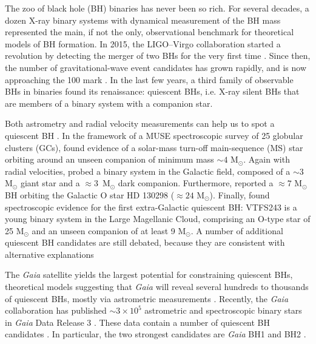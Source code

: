 \documentclass[fleqn,usenatbib]{mnras}
\newcommand{\Ms}{M$_\odot$}
\newcommand{\bh}{\textit{Gaia} BH1}
\begin{document}
The zoo of black hole (BH) binaries has never been so rich. For several decades, a dozen X-ray binary systems with dynamical  measurement of the BH mass \citep{oezel2010,farr2011,miller2015} represented the main, if not the only, observational benchmark for theoretical models of BH formation.  
In 2015, the LIGO--Virgo collaboration started a revolution by detecting the merger of two BHs for the very first time \citep{abbottGW150914}. Since then, the number of gravitational-wave event candidates 
has grown rapidly, and is now approaching the 100 mark \citep{abbottGWTC2.1,abbottGWTC3}. In the last few years, a third family of observable BHs in binaries found its renaissance: quiescent BHs, i.e. X-ray silent BHs that are members of a binary system with a companion star.


Both astrometry and radial velocity measurements can help us to spot a quiescent BH \citep{trimble1969}. In the framework of a MUSE spectroscopic survey of 25 globular clusters (GCs), \cite{giesers2018} found evidence of a solar-mass  turn-off main-sequence (MS) star orbiting around an unseen companion of minimum mass $\sim{4}$ M$_\odot${}. Again with radial velocities, \cite{thompson2019} probed a binary system in the Galactic field, composed of a $\sim{3}$ M$_\odot$ giant star and a $\approx{3}$~M$_\odot$ dark companion. 
Furthermore, \cite{mahy2022} reported a $\approx 7$ \Ms{} BH
orbiting the Galactic O star HD 130298 ($\approx 24$ \Ms). 
Finally, \cite{shenar2022a} found spectroscopic evidence for the first extra-Galactic quiescent BH: VTFS243 is a young binary system in the Large Magellanic Cloud, comprising an O-type star of 25 M$_\odot$ and an unseen companion of at least 9 M$_\odot$. A number of additional quiescent BH candidates are still debated, because they are consistent with alternative explanations \citep[e.g.,][]{lennon2022,saracino2022,saracino2023} 


The \textit{Gaia} satellite yields the largest potential for constraining quiescent BHs, theoretical models suggesting that \textit{Gaia} will reveal several hundreds to thousands of quiescent BHs, mostly via astrometric measurements \citep{breivik2017,mashian2017,yalinewich2018,yamaguchi2018,shahaf2019,andrews2019,shikauchi2020,chawla2022,janssens2022,andrews2023,chakrabarti2022}. Recently, the \textit{Gaia} collaboration has published $\sim{3}\times{10^5}$ astrometric and spectroscopic binary stars in \textit{Gaia} Data Release 3 \citep{gaia2022,holl2022,halbwachs2022}. These data contain a number of quiescent BH candidates \citep{shion2022,shahaf2023,andrews2023b}. In particular, the two strongest candidates are \bh{} \citep{elbadry2023a} and BH2 \citep{elbadry2023b,tanikawa2023bh}.
\end{document}
